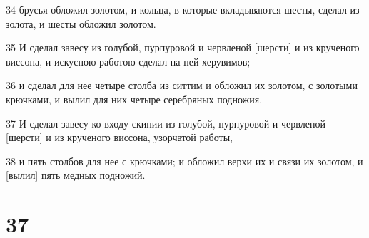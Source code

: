 \par 34 брусья обложил золотом, и кольца, в которые вкладываются шесты, сделал из золота, и шесты обложил золотом.
\par 35 И сделал завесу из голубой, пурпуровой и червленой [шерсти] и из крученого виссона, и искусною работою сделал на ней херувимов;
\par 36 и сделал для нее четыре столба из ситтим и обложил их золотом, с золотыми крючками, и вылил для них четыре серебряных подножия.
\par 37 И сделал завесу ко входу скинии из голубой, пурпуровой и червленой [шерсти] и из крученого виссона, узорчатой работы,
\par 38 и пять столбов для нее с крючками; и обложил верхи их и связи их золотом, и [вылил] пять медных подножий.

\chapter{37}


